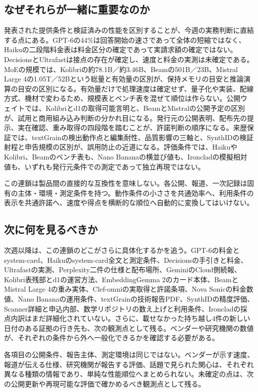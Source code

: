 \subsection*{なぜそれらが一緒に重要なのか}
発表された提供条件と検証済みの性能を区別することが、今週の実務判断に直結する点にある。GPT-6の44\%は回答開始の速さであって全体の短縮ではなく、Haikuの二段階料金表は料金区分の確定であって実請求額の確定ではない\cite{gpt6ui}\cite{haiku55}。DecisionsとUltrafastは接点の存在が確定し、速度と料金の実測は未確定である\cite{decisions}\cite{ultrafast}。MoEの規模では、Kolibriの約78.1B／約3.46B、Beamの501B／23B、Mistral Large 4の1.05T／52Bという総量と有効量の区別が、保持メモリの目安と推論演算の目安の区別になる\cite{kolibri}\cite{beam}\cite{mistral4}。有効量だけで処理速度は確定せず、量子化や実装、配線方式、機材で変わるため、規模表とベンチ表を混ぜて順位は作らない。公開ウェイトでは、Kolibriとd1の取得可能言明と、BeamとMistralの公開予定の区別が、試用と商用組み込み判断の分かれ目になる\cite{kolibri}\cite{liquidd1}\cite{beam}\cite{mistral4}。発行元の公開表明、配布先の提示、実在確認、重み取得の四段階を踏むことが、許諾判断の順序になる。来歴保証では、textGrainの検出動作点と編集耐性、品質影響の三軸と、SynthIDの検証射程と申告規模の区別が、誤用防止の近道になる\cite{textgrain}\cite{synthid}。評価条件では、HaikuやKolibri、Beamのベンチ表も、Nano Bananaの横並び値も、Ironcladの模擬相対値も、いずれも発行元条件での測定であって独立再現ではない\cite{haiku55}\cite{kolibri}\cite{beam}\cite{nanobanana}\cite{ironclad}。

この連鎖は製品間の直接的な互換性を意味しない。各公開、報道、一次記録は固有の主体・環境・測定条件を持つ。動作条件の小ささを共通効率へ、利用条件の表示を共通許諾へ、速度や得点を横断的な順位へ自動的に変換してはいけない。

\subsection*{次に何を見るべきか}
次週以降は、この連鎖のどこがさらに具体化するかを追う。GPT-6の料金とsystem-card、Haikuのsystem-card全文と測定条件、Decisionsの手引きと料金、Ultrafastの実測、Perplexity二件の仕様と配布場所、GeminiのCloud側続報、Kolibri表残部とd1の運営方法、EmbeddingGemma 2のカード本体、BeamとMistral Large 4の重み実体、Clef-omniの実取得と許諾条項、Nova Sonicの料金数値、Nano Bananaの運用条件、textGrainの技術報告PDF、SynthIDの精度評価、Scanner詳細と申込内部、数学リポジトリの数え上げと利用条件、Ironcladの採点内訳はまだ詳細化されていない。さらに、載せなかった持ち越し4件の新しい日付のある証拠の行き先も、次の観測点として残る。ベンダーや研究機関の数値が、それぞれの条件から外へ一般化できるかを確認する必要がある。

\begin{claimboundary}[この総括の読み方]
各項目の公開条件、報告主体、測定環境は同じではない。ベンダーが示す速度、報道が伝える仕様、研究機関が報告する評価、話題で見られた関心は、それぞれ異なる種類の情報であり、単純な性能順位へまとめられない。未確定の点は、次の公開更新や再現可能な評価で確かめるべき観測点として残る。
\end{claimboundary}
